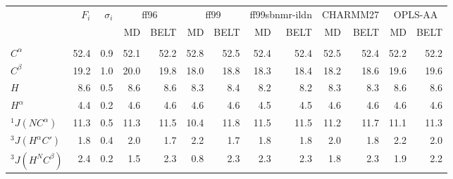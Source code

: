 \documentclass[journal=jacsat,manuscript=article]{achemso}
\begin{document}
\begin{table}

\small

\begin{tabular}{lrrrrrrrrrrrr}
\toprule
   &  $F_i$ &  $\sigma_i$ &  \multicolumn{2}{c}{ff96}             &  \multicolumn{2}{c}{ff99}    &  \multicolumn{2}{c}{ff99sbnmr-ildn}   &  \multicolumn{2}{c}{CHARMM27}       &  \multicolumn{2}{c}{OPLS-AA}               \\
   &        &             &  MD   & BELT & MD   & BELT & MD   & BELT & MD   & BELT & MD   & BELT  \\
         &      &              &          &                 &          &                 &                    &                           &           &                  &         &                \\
$C^\alpha$           & 52.4 &          0.9 &     52.1 &            52.2 &     52.8 &            52.5 &               52.4 &                      52.4 &      52.5 &             52.4 &    52.2 &           52.2 \\
$C^\beta$           & 19.2 &          1.0 &     20.0 &            19.8 &     18.0 &            18.8 &               18.3 &                      18.4 &      18.2 &             18.6 &    19.6 &           19.6 \\
$H$            &  8.6 &          0.5 &      8.6 &             8.6 &      8.3 &             8.4 &                8.2 &                       8.2 &       8.3 &              8.3 &     8.6 &            8.6 \\
$H^\alpha$           &  4.4 &          0.2 &      4.6 &             4.6 &      4.6 &             4.6 &                4.5 &                       4.5 &       4.6 &              4.6 &     4.6 &            4.6 \\
$^1J(NC^\alpha)$      & 11.3 &          0.5 &     11.3 &            11.5 &     10.4 &            11.8 &               11.5 &                      11.5 &      11.2 &             11.7 &    11.1 &           11.3 \\
$^3J(H^\alpha C\prime)$ &  1.8 &          0.4 &      2.0 &             1.7 &      2.2 &             1.7 &                1.8 &                       1.8 &       2.0 &              1.8 &     2.2 &            2.0 \\
$^3J(H^NC^\beta)$     &  2.4 &          0.2 &      1.5 &             2.3 &      0.8 &             2.3 &                2.3 &                       2.3 &       1.8 &              2.3 &     1.9 &            2.2 \\

\end{tabular}
\end{table}
\end{document}
